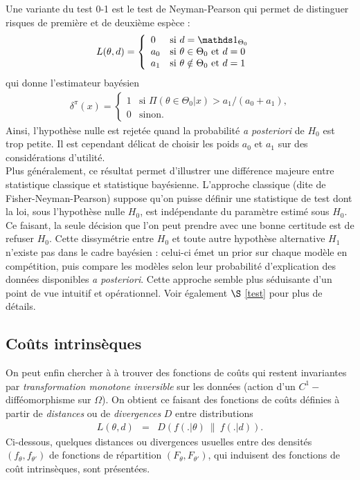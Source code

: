 Une variante du test 0-1 est le test de Neyman-Pearson qui permet de distinguer risques de première et de deuxième espèce :
\begin{eqnarray}
L(\theta,d)  =  \left\{\begin{array}{ll} 0 & \text{si $d=\I_{\Theta_0}$} \\ a_0 & \text{si $\theta\in\Theta_0$ et $d=0$} \\ a_1 & \text{si $\theta\notin\Theta_0$ et $d=1$} \end{array}\right. &  & \label{cout.generalise}
\end{eqnarray}
qui donne l'estimateur bayésien
\begin{eqnarray*}
\delta^{\pi}(x)  =  \left\{\begin{array}{ll} 1 & \text{si $\Pi(\theta\in\Theta_0|x) > a_1/(a_0+a_1)$,} \\ 0 & \text{sinon.} \end{array}\right. 
\end{eqnarray*}
Ainsi, l'hypothèse nulle est rejetée quand la probabilité {\it a posteriori} de $H_0$ est trop petite. Il est cependant délicat de choisir les poids $a_0$ et $a_1$ sur des considérations d'utilité. \\

 Plus généralement, ce résultat permet d'illustrer une différence majeure entre statistique classique et statistique bayésienne. L'approche classique (dite de Fisher-Neyman-Pearson) suppose qu'on puisse définir une statistique de test dont la loi, sous l'hypothèse nulle $H_0$, est indépendante du paramètre estimé sous $H_0$. Ce faisant, la seule décision que l'on peut prendre avec une bonne certitude est de refuser $H_0$. Cette dissymétrie entre $H_0$ et toute autre hypothèse alternative $H_1$ n'existe pas dans le cadre bayésien : celui-ci émet un prior sur chaque modèle en compétition, puis compare les modèles selon leur probabilité d'explication des données disponibles {\it a posteriori}. Cette approche semble plus séduisante d'un point de vue intuitif et opérationnel. Voir également $\S$ \ref{test} pour plus de détails.


\subsection{Coûts intrinsèques}

On peut enfin chercher à à trouver des fonctions de co\^uts qui restent invariantes par \emph{transformation monotone inversible} sur les données (action d'un $C^1-$difféomorphisme sur $\Omega$). On obtient ce faisant des fonctions de co\^uts définies à partir de \emph{distances}  ou de \emph{divergences} $D$ entre distributions 
\begin{eqnarray*}
L(\theta,d) & = & D(f(.|\theta) \ \| \ f(.|d)). 
\end{eqnarray*}
Ci-dessous, quelques distances ou divergences usuelles entre des densités $(f_{\theta},f_{\theta'})$ de fonctions de répartition $(F_{\theta},F_{\theta'})$, qui induisent des fonctions de coût intrinsèques, sont présentées. 

